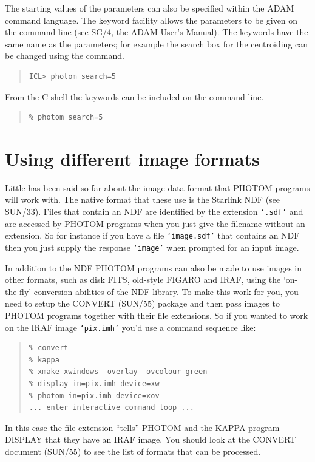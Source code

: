 \documentclass[twoside,11pt]{article}
\newcommand{\xref}[3]{#1}
\newcommand{\xlabel}[1]{}
\renewcommand{\_}{\texttt{\symbol{95}}}
\newcommand{\st}[1]{\texttt{`#1'}}
\begin{document}
The starting values of the parameters can also be specified within the
ADAM command language. The keyword facility allows the parameters to
be given on the command line (see \xref{SG/4}{sg4}{}, the ADAM User's
Manual). The keywords have the same name as the parameters; for
example the search box for the centroiding can be changed using the
command.
\begin{quote}
\begin{verbatim}
ICL> photom search=5
\end{verbatim}
\end{quote}

From the C-shell the keywords can be included on the command line.
\begin{quote}
\begin{verbatim}
% photom search=5
\end{verbatim}
\end{quote}

\section{\xlabel{using_different_image_formats}Using \xlabel{dataformat}different \label{dataformat}image formats}

Little has been said so far about the image data format that PHOTOM
programs will work with. The native format that these use is the
Starlink NDF (see \xref{SUN/33}{sun33}{what_is_an_ndf}). Files that
contain an NDF are identified by the extension \st{.sdf} and are
accessed by PHOTOM programs when you just give the filename without an
extension. So for instance if you have a file \st{image.sdf} that
contains an NDF then you just supply the response \st{image} when
prompted for an input image.

In addition to the NDF PHOTOM programs can also be made to use images
in other formats, such as disk FITS, old-style FIGARO and IRAF, using
the `on-the-fly' conversion abilities of the NDF library.
To make this work for you, you need to setup the CONVERT
(\xref{SUN/55}{sun55}{}) package and then pass images to PHOTOM
programs together with their file extensions. So if you wanted to work
on the IRAF image \st{pix.imh} you'd use a command sequence like:
\begin{quote}
\begin{verbatim}
% convert
% kappa
% xmake xwindows -overlay -ovcolour green
% display in=pix.imh device=xw
% photom in=pix.imh device=xov
... enter interactive command loop ...
\end{verbatim}
\end{quote}
In this case the file extension ``tells'' PHOTOM and the
\xref{KAPPA}{sun95}{} program \xref{DISPLAY}{sun95}{DISPLAY} that they
have an IRAF image. You should look at the CONVERT document (SUN/55)
to see the list of formats that can be processed.
\end{document}
